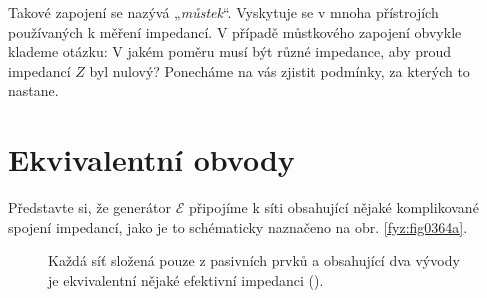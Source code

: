   Takové zapojení se nazývá „\emph{můstek}“. Vyskytuje se v mnoha přístrojích používaných k měření 
  impedancí. V případě můstkového zapojení obvykle klademe otázku: V jakém poměru musí být různé 
  impedance, aby proud impedancí \(Z\) byl nulový? Ponecháme na vás zjistit podmínky, za kterých to 
  nastane.

\section{Ekvivalentní obvody}\label{fyz:IIchapXXIIsecIV}
  Představte si, že generátor \(\mathscr{E}\) připojíme k síti obsahující nějaké komplikované 
  spojení impedancí, jako je to schématicky naznačeno na obr. \ref{fyz:fig0364a}.
  
  \begin{figure}[hb!] %
    \centering
    \caption{Každá síť složená pouze z pasivních prvků a obsahující dva vývody je ekvivalentní 
             nějaké efektivní impedanci
             (\cite[s.~404]{Feynman02}).}
    \label{fyz:fig0364}
  \end{figure}
  
